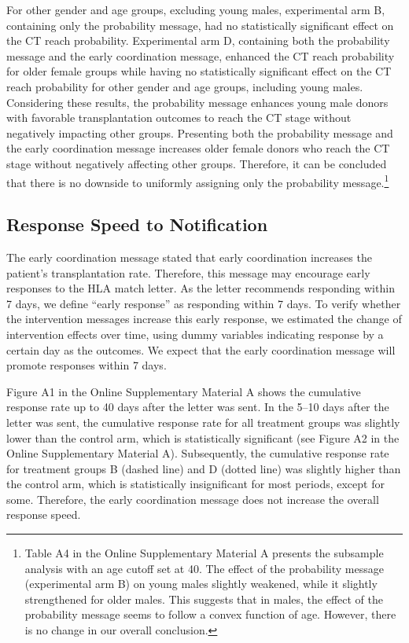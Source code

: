 \documentclass[12pt, a4paper]{article}
\begin{document}
For other gender and age groups, excluding young males, experimental arm B, containing only the probability message, had no statistically significant effect on the CT reach probability. Experimental arm D, containing both the probability message and the early coordination message, enhanced the CT reach probability for older female groups while having no statistically significant effect on the CT reach probability for other gender and age groups, including young males. Considering these results, the probability message enhances young male donors with favorable transplantation outcomes to reach the CT stage without negatively impacting other groups. Presenting both the probability message and the early coordination message increases older female donors who reach the CT stage without negatively affecting other groups. Therefore, it can be concluded that there is no downside to uniformly assigning only the probability message.\footnote{Table A4 in the Online Supplementary Material A presents the subsample analysis with an age cutoff set at 40. The effect of the probability message (experimental arm B) on young males slightly weakened, while it slightly strengthened for older males. This suggests that in males, the effect of the probability message seems to follow a convex function of age. However, there is no change in our overall conclusion.}

\hypertarget{reply-speed}{%
\subsection{Response Speed to Notification}\label{reply-speed}}

The early coordination message stated that early coordination increases the patient's transplantation rate. Therefore, this message may encourage early responses to the HLA match letter. As the letter recommends responding within 7 days, we define ``early response'' as responding within 7 days. To verify whether the intervention messages increase this early response, we estimated the change of intervention effects over time, using dummy variables indicating response by a certain day as the outcomes. We expect that the early coordination message will promote responses within 7 days.

Figure A1 in the Online Supplementary Material A shows the cumulative response rate up to 40 days after the letter was sent. In the 5--10 days after the letter was sent, the cumulative response rate for all treatment groups was slightly lower than the control arm, which is statistically significant (see Figure A2 in the Online Supplementary Material A). Subsequently, the cumulative response rate for treatment groups B (dashed line) and D (dotted line) was slightly higher than the control arm, which is statistically insignificant for most periods, except for some. Therefore, the early coordination message does not increase the overall response speed.
\end{document}
